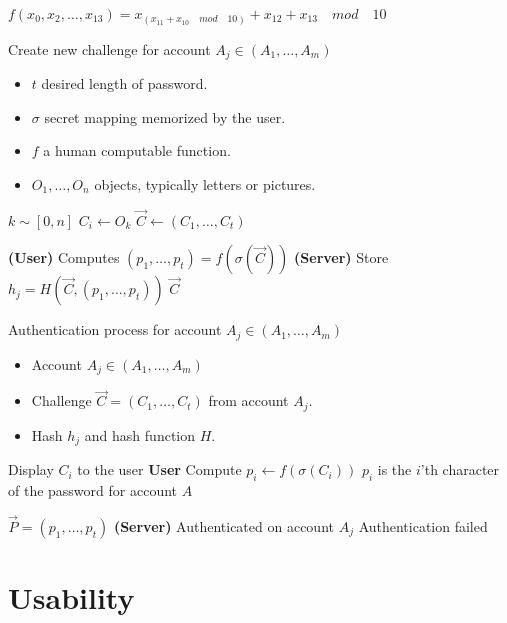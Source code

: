 \begin{definition}
    $f(x_0,x_2,\dots,x_{13}) = x_{(x_{11} + x_{10}\quad mod \quad 10)} + x_{12} + x_{13}\quad mod \quad 10$ 
\end{definition}

\begin{algorithm}
    \caption{Create new challenge for account $A_j \in (A_1,\dots, A_m)$}\label{new-challenge}
    \begin{algorithmic}[1]
        \Require
            \Statex \begin{itemize}
                \item $t$ desired length of password.
                \item $\sigma$ secret mapping memorized by the user.
                \item $f$ a human computable function.
                \item $O_1,\dots,O_n$ objects, typically letters or pictures.
            \end{itemize}
            
        
            \State $k \sim [0, n] $
            \State $C_i \leftarrow O_k $
        \EndFor
        \Statex
        \State $\vec C \leftarrow (C_1,\dots, C_t) $

        \State \textbf{(User)} Computes $(p_1,\dots,p_t)=f(\sigma(\vec C))$
        \State \textbf{(Server)} Store $h_j = H(\vec C , (p_1,\dots,p_t))$
        \State
        \State \Return $\vec C$
    \end{algorithmic}
\end{algorithm}


\begin{algorithm}
    \caption{Authentication process for account $A_j \in (A_1,\dots,A_m)$}\label{auth-proccess}
    \begin{algorithmic}[1]
        \Require
            \Statex \begin{itemize}
                \item Account $A_j \in (A_1,\dots, A_m)$
                \item Challenge $\vec C = (C_1,\dots,C_t)$ from account $A_j$.
                \item Hash $h_j$ and hash function $H$.
            \end{itemize}

                \State Display $C_i$ to the user
                \State \textbf{User} Compute $p_i \leftarrow f(\sigma(C_i))$
                \State
                \Comment $p_i$ is the $i$'th character of the password for account $A$
            \EndFor

            \State $\vec P = (p_1,\dots,p_t)$
            \Comment \textbf{(Server)} 
                \State Authenticated on account $A_j$
            \Else 
                \State Authentication failed
            \EndIf




    \end{algorithmic}
\end{algorithm}


\section{Usability}


